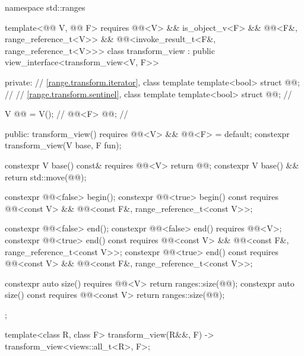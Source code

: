 %
%
%
\begin{codeblock}
namespace std::ranges {
  template<@@ V, @@ F>
    requires @@<V> && is_object_v<F> &&
             @@<F&, range_reference_t<V>> &&
             @@<invoke_result_t<F&, range_reference_t<V>>>
  class transform_view : public view_interface<transform_view<V, F>> {
  private:
    // \ref{range.transform.iterator}, class template 
    template<bool> struct @@;             // \expos
    // \ref{range.transform.sentinel}, class template 
    template<bool> struct @@;             // \expos

    V @@ = V();                              // \expos
    @@<F> @@;                       // \expos

  public:
    transform_view() requires @@<V> && @@<F> = default;
    constexpr transform_view(V base, F fun);

    constexpr V base() const& requires @@<V> { return @@; }
    constexpr V base() && { return std::move(@@); }

    constexpr @@<false> begin();
    constexpr @@<true> begin() const
      requires @@<const V> &&
               @@<const F&, range_reference_t<const V>>;

    constexpr @@<false> end();
    constexpr @@<false> end() requires @@<V>;
    constexpr @@<true> end() const
      requires @@<const V> &&
               @@<const F&, range_reference_t<const V>>;
    constexpr @@<true> end() const
      requires @@<const V> &&
               @@<const F&, range_reference_t<const V>>;

    constexpr auto size() requires @@<V> { return ranges::size(@@); }
    constexpr auto size() const requires @@<const V>
    { return ranges::size(@@); }
  };

  template<class R, class F>
    transform_view(R&&, F) -> transform_view<views::all_t<R>, F>;
}
\end{codeblock}

